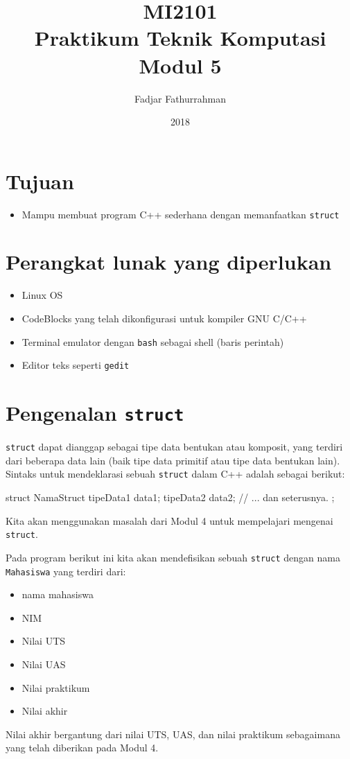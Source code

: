 \documentclass[a4paper,11pt]{extarticle}
\title{
MI2101\\
Praktikum Teknik Komputasi\\
Modul 5}
\author{Fadjar Fathurrahman}
\date{2018}
\begin{document}
\maketitle

\section{Tujuan}
\begin{itemize}
\item Mampu membuat program C++ sederhana dengan memanfaatkan \texttt{struct}
\end{itemize}

\section{Perangkat lunak yang diperlukan}
\begin{itemize}
\item Linux OS
\item CodeBlocks yang telah dikonfigurasi untuk kompiler GNU C/C++
\item Terminal emulator dengan \texttt{bash} sebagai shell (baris perintah)
\item Editor teks seperti \texttt{gedit}
\end{itemize}

\section{Pengenalan \texttt{struct}}
\texttt{struct} dapat dianggap sebagai tipe data bentukan atau komposit, yang terdiri
dari beberapa data lain (baik tipe data primitif atau tipe data bentukan lain).
Sintaks untuk mendeklarasi sebuah \texttt{struct} dalam C++ adalah
sebagai berikut:
\begin{cppcode}
struct NamaStruct {
  tipeData1 data1;
  tipeData2 data2;
  // ... dan seterusnya.
};
\end{cppcode}

Kita akan menggunakan masalah dari Modul 4 untuk mempelajari mengenai
\texttt{struct}.

Pada program berikut ini kita akan mendefisikan sebuah \texttt{struct} dengan
nama \texttt{Mahasiswa} yang terdiri dari:
\begin{itemize}
\item nama mahasiswa
\item NIM
\item Nilai UTS
\item Nilai UAS
\item Nilai praktikum
\item Nilai akhir
\end{itemize}
Nilai akhir bergantung dari nilai UTS, UAS, dan nilai praktikum sebagaimana
yang telah diberikan pada Modul 4.
\end{document}
